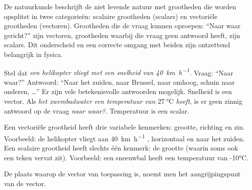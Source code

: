 \documentclass{ximera}
\begin{document}
	\author{Bart Lambregs}
    \xmsource\xmuitleg


De natuurkunde beschrijft de niet levende natuur met grootheden die worden opsplitst in twee categorieën: scalaire grootheden (scalars) en vectoriële grootheden (vectoren). 
Grootheden die de vraag kunnen oproepen: “Naar waar gericht?” zijn vectoren, grootheden waarbij die vraag geen antwoord heeft, zijn scalars. 
Dit onderscheid en een correcte omgang met beiden zijn ontzettend belangrijk in fysica.


Stel dat \textit{een helikopter vliegt met een snelheid van \SI{40}{\kilo\meter\per\hour}.} 
Vraag: “Naar waar?” Antwoord: “Naar het zuiden, naar Brussel, naar omhoog, schuin naar onderen, …” 
Er zijn vele betekenisvolle antwoorden mogelijk. 
Snelheid is een vector. 
Als \textit{het zwembadwater een temperatuur van  \(\SI{27}{\celsius}\) heeft}, is er geen zinnig antwoord op de vraag \textit{naar waar?}. 
Temperatuur is een scalar.



Een vectoriële grootheid heeft drie variabele kenmerken: grootte, richting en zin. Voorbeeld: de helikopter vliegt aan \SI{40}{\kilo\meter\per\hour} , horizontaal en naar het zuiden. 
Een scalaire grootheid heeft slechts één kenmerk: de grootte (waarin soms ook een teken vervat zit). 
Voorbeeld: een sneeuwbal heeft een temperatuur van -10°C.

De plaats waarop de vector van toepassing is, noemt men het aangrijpingspunt van de vector.



\begin{xmuitweiding}
\end{xmuitweiding}





	
\end{document}
